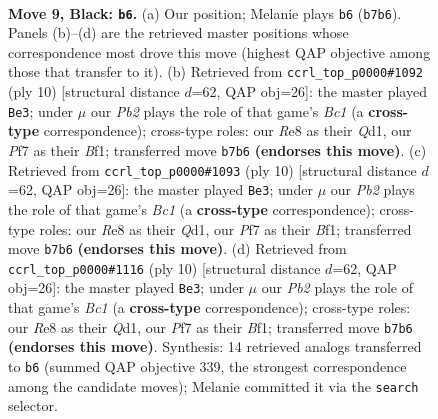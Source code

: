 \documentclass[11pt]{article}
\begin{document}
\clearpage

\begin{figure}[p]\centering
\begin{subfigure}{0.46\textwidth}\centering
\resizebox{\linewidth}{!}{%
\newchessgame
\chessboard[
  setfen={rnbqr1k1/ppp1bppp/4p3/3n4/2NP4/3Q2P1/PP2PPBP/RNB2RK1 b - - 2 9},
  showmover=false,
  pgfstyle=straightmove, color=movearrow, markmove={b7-b6}
]}
\caption{}
\end{subfigure}\hfill
\begin{subfigure}{0.46\textwidth}\centering
\resizebox{\linewidth}{!}{%
\newchessgame
\chessboard[
  setfen={rnbqk1nr/pp2ppbp/3p2p1/8/3NP3/2N5/PPP2PPP/R1BQKB1R w KQkq - 2 6},
  showmover=false,
  pgfstyle=straightmove, color=movearrow, markmove={c1-e3}
]}
\caption{}
\end{subfigure}
\\[4pt]
\begin{subfigure}{0.46\textwidth}\centering
\resizebox{\linewidth}{!}{%
\newchessgame
\chessboard[
  setfen={rnbqk1nr/pp2ppbp/3p2p1/8/3NP3/2N5/PPP2PPP/R1BQKB1R w KQkq - 2 6},
  showmover=false,
  pgfstyle=straightmove, color=movearrow, markmove={c1-e3}
]}
\caption{}
\end{subfigure}\hfill
\begin{subfigure}{0.46\textwidth}\centering
\resizebox{\linewidth}{!}{%
\newchessgame
\chessboard[
  setfen={rnbqk1nr/pp2ppbp/3p2p1/8/3NP3/2N5/PPP2PPP/R1BQKB1R w KQkq - 2 6},
  showmover=false,
  pgfstyle=straightmove, color=movearrow, markmove={c1-e3}
]}
\caption{}
\end{subfigure}
\caption{\textbf{Move 9, Black: \texttt{b6}.} (a) Our position; Melanie plays \texttt{b6} (\texttt{b7b6}). Panels (b)--(d) are the retrieved master positions whose correspondence most drove this move (highest QAP objective among those that transfer to it). (b) Retrieved from \texttt{ccrl\_top\_p0000\#1092} (ply 10) [structural distance $d$=62, QAP obj=26]: the master played \texttt{Be3}; under $\mu$ our \emph{Pb2} plays the role of that game's \emph{Bc1} (a \textbf{cross-type} correspondence); cross-type roles: our \emph{R}e8 as their \emph{Q}d1, our \emph{P}f7 as their \emph{B}f1; transferred move \texttt{b7b6} \textbf{(endorses this move)}. (c) Retrieved from \texttt{ccrl\_top\_p0000\#1093} (ply 10) [structural distance $d$=62, QAP obj=26]: the master played \texttt{Be3}; under $\mu$ our \emph{Pb2} plays the role of that game's \emph{Bc1} (a \textbf{cross-type} correspondence); cross-type roles: our \emph{R}e8 as their \emph{Q}d1, our \emph{P}f7 as their \emph{B}f1; transferred move \texttt{b7b6} \textbf{(endorses this move)}. (d) Retrieved from \texttt{ccrl\_top\_p0000\#1116} (ply 10) [structural distance $d$=62, QAP obj=26]: the master played \texttt{Be3}; under $\mu$ our \emph{Pb2} plays the role of that game's \emph{Bc1} (a \textbf{cross-type} correspondence); cross-type roles: our \emph{R}e8 as their \emph{Q}d1, our \emph{P}f7 as their \emph{B}f1; transferred move \texttt{b7b6} \textbf{(endorses this move)}. Synthesis: 14 retrieved analogs transferred to \texttt{b6} (summed QAP objective 339, the strongest correspondence among the candidate moves); Melanie committed it via the \texttt{search} selector.}
\label{fig:thought-m17}
\end{figure}
\end{document}
